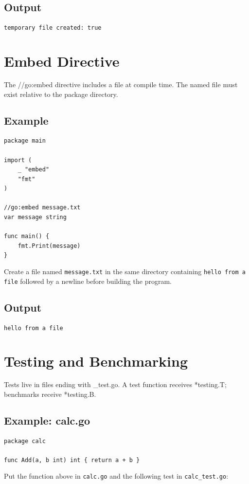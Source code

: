 \documentclass[10pt,oneside]{article}
\newcommand{\sectionline}{\par\vspace{4pt}{\color{rule}\hrule height .5pt}\vspace{7pt}\color{ink}\noindent}
\begin{document}
\subsection*{Output}
\begin{lstlisting}[style=terminal]
temporary file created: true
\end{lstlisting}
\clearpage
\section{Embed Directive}
\sectionline
The //go:embed directive includes a file at compile time. The named file must exist relative to the package directory.\par
\subsection*{Example}
\begin{lstlisting}[style=gocode]
package main

import (
	_ "embed"
	"fmt"
)

//go:embed message.txt
var message string

func main() {
	fmt.Print(message)
}
\end{lstlisting}
Create a file named \texttt{message.txt} in the same directory containing \texttt{hello from a file} followed by a newline before building the program.
\subsection*{Output}
\begin{lstlisting}[style=terminal]
hello from a file
\end{lstlisting}
\clearpage
\section{Testing and Benchmarking}
\sectionline
Tests live in files ending with \_test.go. A test function receives *testing.T; benchmarks receive *testing.B.\par
\subsection*{Example: calc.go}
\begin{lstlisting}[style=gocode]
package calc

func Add(a, b int) int { return a + b }
\end{lstlisting}
Put the function above in \texttt{calc.go} and the following test in \texttt{calc\_test.go}:
\end{document}
